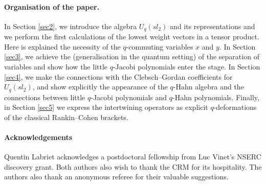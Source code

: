 \documentclass[a4paper,12pt]{article}
\numberwithin{equation}{section}
\theoremstyle{rem}
\theoremstyle{definition}
\begin{document}
\paragraph{Organisation of the paper.} In Section \ref{sec2}, we introduce the algebra $U_q(sl_2)$ and its representations and we perform the first calculations of the lowest weight vectors in a tensor product. Here is explained the necessity of the $q$-commuting variables $x$ and $y$. In Section \ref{sec3}, we achieve the (generalisation in the quantum setting) of the separation of variables and show how the little $q$-Jacobi polynomials enter the stage. In Section \ref{sec4}, we make the connections with the Clebsch--Gordan coefficients for $U_q(sl_2)$, and show explicitly the appearance of the $q$-Hahn algebra and the connections between little $q$-Jacobi polynomials and $q$-Hahn polynomials. Finally, in Section \ref{sec5} we express the intertwining operators as explicit $q$-deformations of the classical Rankin--Cohen brackets.

\paragraph{Acknowledgements} Quentin Labriet acknowledges a postdoctoral fellowship from Luc Vinet’s NSERC discovery grant. Both authors also wish to thank the CRM for its hospitality. The authors also thank an anonymous referee for their valuable suggestions.
\end{document}
